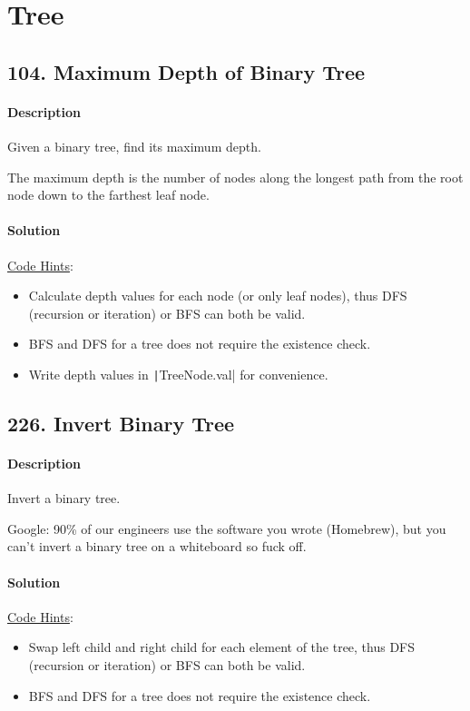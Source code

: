 \section{Tree}

\subsection{104. Maximum Depth of Binary Tree}

\paragraph{\color{white} \colorbox{Mahogany}{Description}}
Given a binary tree, find its maximum depth.

The maximum depth is the number of nodes along the longest path from the root node down to the farthest leaf node.

\paragraph{\color{white} \colorbox{OliveGreen}{Solution}}
\underline{Code Hints}:
\begin{itemize}
    \item Calculate depth values for each node (or only leaf nodes), thus DFS (recursion or iteration) or BFS can both be valid.
    \item BFS and DFS for a tree does not require the existence check.
    \item Write depth values in \texttt|TreeNode.val| for convenience.
\end{itemize}

\subsection{226. Invert Binary Tree}

\paragraph{\color{white} \colorbox{Mahogany}{Description}}
Invert a binary tree.

Google: 90\% of our engineers use the software you wrote (Homebrew), but you can’t invert a binary tree on a whiteboard so fuck off.

\paragraph{\color{white} \colorbox{OliveGreen}{Solution}}
\underline{Code Hints}:
\begin{itemize}
    \item Swap left child and right child for each element of the tree, thus DFS (recursion or iteration) or BFS can both be valid.
    \item BFS and DFS for a tree does not require the existence check.
\end{itemize}
